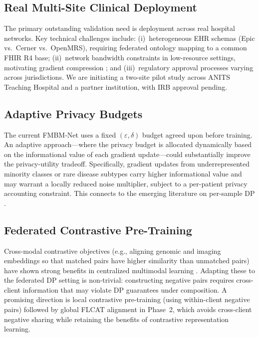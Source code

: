 \documentclass{ieeeaccess}
\begin{document}
\subsection{Real Multi-Site Clinical Deployment}

The primary outstanding validation need is deployment across real hospital
networks. Key technical challenges include: (i)~heterogeneous EHR schemas
(Epic vs.\ Cerner vs.\ OpenMRS), requiring federated ontology mapping to
a common FHIR R4 base; (ii)~network bandwidth constraints in low-resource
settings, motivating gradient compression \cite{karimireddy2020scaffold};
and (iii)~regulatory approval processes varying across jurisdictions.
We are initiating a two-site pilot study across ANITS Teaching Hospital and
a partner institution, with IRB approval pending.

\subsection{Adaptive Privacy Budgets}

The current FMBM-Net uses a fixed $(\varepsilon,\delta)$ budget agreed upon
before training. An adaptive approach---where the privacy budget is allocated
dynamically based on the informational value of each gradient update---could
substantially improve the privacy-utility tradeoff. Specifically, gradient
updates from underrepresented minority classes or rare disease subtypes
carry higher informational value and may warrant a locally reduced noise
multiplier, subject to a per-patient privacy accounting constraint. This
connects to the emerging literature on per-sample DP \cite{gopi2021prv}.

\subsection{Federated Contrastive Pre-Training}

Cross-modal contrastive objectives (e.g., aligning genomic and imaging
embeddings so that matched pairs have higher similarity than unmatched pairs)
have shown strong benefits in centralized multimodal learning \cite{huang2021multimodal}.
Adapting these to the federated DP setting is non-trivial: constructing
negative pairs requires cross-client information that may violate DP guarantees
under composition. A promising direction is local contrastive pre-training
(using within-client negative pairs) followed by global FLCAT alignment in
Phase~2, which avoids cross-client negative sharing while retaining the
benefits of contrastive representation learning.
\end{document}
